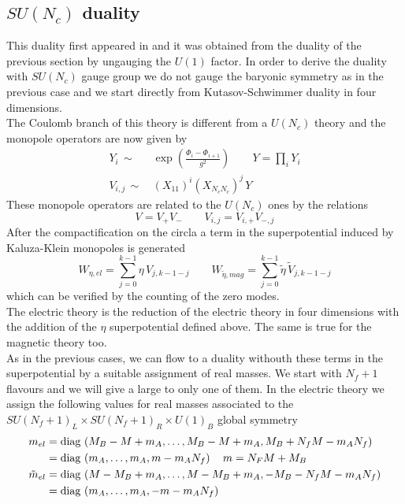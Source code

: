 \subsection{ $SU(N_c)$ duality }
This duality first appeared in \cite{Park:2013wta} and it was obtained from the duality of the previous section by ungauging the $U(1)$ factor.
In order to derive the duality with $SU(N_c)$ gauge group we do not gauge the baryonic symmetry as in the previous case and we start directly from Kutasov-Schwimmer duality in four dimensions.
\\
The Coulomb branch of this theory is different from a $U(N_c)$ theory and the monopole operators are now given by
\begin{align}
Y_i \, \sim \, & \exp \left(   \frac{ \Phi_i - \Phi_{i+1}}{g^2}  \right) \qquad 
Y = \prod_i Y_i
\\
V_{i,j} \, \sim \, & (X_{11})^i (X_{N_c N_c})^j\, Y
\end{align}
These monopole operators are related to the $U(N_c)$ ones by the relations
\begin{equation}
 V = V_+ V_- \qquad V_{i,j} = V_{i,+} V_{-,j}
 \end{equation} 
After the compactification on the circla a term in the superpotential induced by Kaluza-Klein monopoles is generated \cite{Nii:2014jsa}
\begin{equation}
W_{\eta, el} = \sum_{j=0}^{k-1} \eta \, V_{j,k-1-j} \qquad W_{\tilde{\eta}, mag} = \sum_{j=0}^{k-1 } \tilde{\eta} \, \tilde{V}_{j,k-1-j} 
\end{equation}  
which can be verified by the counting of the zero modes.\\
The electric theory is the reduction of the electric theory in four dimensions with the addition of the $\eta$ superpotential defined above.
The same is true for the magnetic theory too.\\
As in the previous cases, we can flow to a duality withouth these terms in the superpotential by a suitable assignment of real masses. 
We start with $N_f+1$ flavours and we will give a large to only one of them.
In the electric theory we assign the following values for real masses associated to the $SU(N_f+1)_L \times SU(N_f+1)_R \times U(1)_B$ global symmetry
\begin{align}
m_{el} &= \hbox{diag\,} \left(  M_B - M  + m_A, \dotsc,M_B - M  + m_A,  M_B + N_f M - m_A N_f     \right) \\
&= \hbox{diag\,} \left(  m_A, \dotsc, m_A, m - m_A N_f     \right) \quad m= N_F M + M_B\\
\tilde{m}_{el} &= \hbox{diag\,} \left(   M -M_B   + m_A, \dotsc, M -M_B   + m_A,  - M_B -  N_f M - m_A N_f     \right) \\
&= \hbox{diag\,} \left(  m_A, \dotsc, m_A, - m - m_A N_f     \right) 
\end{align}
